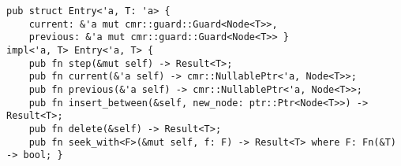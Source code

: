 \begin{lstlisting}[style=Rust,caption=Partial \code{Entry} API from the List implementation.,
                   label={lst:list-entry}]
pub struct Entry<'a, T: 'a> {
    current: &'a mut cmr::guard::Guard<Node<T>>,
    previous: &'a mut cmr::guard::Guard<Node<T>> }
impl<'a, T> Entry<'a, T> {
    pub fn step(&mut self) -> Result<T>;
    pub fn current(&'a self) -> cmr::NullablePtr<'a, Node<T>>;
    pub fn previous(&'a self) -> cmr::NullablePtr<'a, Node<T>>;
    pub fn insert_between(&self, new_node: ptr::Ptr<Node<T>>) -> Result<T>;
    pub fn delete(&self) -> Result<T>;
    pub fn seek_with<F>(&mut self, f: F) -> Result<T> where F: Fn(&T) -> bool; }\end{lstlisting}

